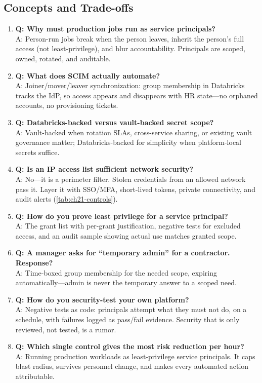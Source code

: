 \subsection{Concepts and Trade-offs}
\begin{enumerate}
    \item \textbf{Q: Why must production jobs run as service principals?}\\
    A: Person-run jobs break when the person leaves, inherit the person's full access (not least-privilege), and blur accountability. Principals are scoped, owned, rotated, and auditable.
    \item \textbf{Q: What does SCIM actually automate?}\\
    A: Joiner/mover/leaver synchronization: group membership in Databricks tracks the IdP, so access appears and disappears with HR state---no orphaned accounts, no provisioning tickets.
    \item \textbf{Q: Databricks-backed versus vault-backed secret scope?}\\
    A: Vault-backed when rotation SLAs, cross-service sharing, or existing vault governance matter; Databricks-backed for simplicity when platform-local secrets suffice.
    \item \textbf{Q: Is an IP access list sufficient network security?}\\
    A: No---it is a perimeter filter. Stolen credentials from an allowed network pass it. Layer it with SSO/MFA, short-lived tokens, private connectivity, and audit alerts (\cref{tab:ch21-controls}).
    \item \textbf{Q: How do you prove least privilege for a service principal?}\\
    A: The grant list with per-grant justification, negative tests for excluded access, and an audit sample showing actual use matches granted scope.
    \item \textbf{Q: A manager asks for ``temporary admin'' for a contractor. Response?}\\
    A: Time-boxed group membership for the needed scope, expiring automatically---admin is never the temporary answer to a scoped need.
    \item \textbf{Q: How do you security-test your own platform?}\\
    A: Negative tests as code: principals attempt what they must not do, on a schedule, with failures logged as pass/fail evidence. Security that is only reviewed, not tested, is a rumor.
    \item \textbf{Q: Which single control gives the most risk reduction per hour?}\\
    A: Running production workloads as least-privilege service principals. It caps blast radius, survives personnel change, and makes every automated action attributable.
\end{enumerate}

